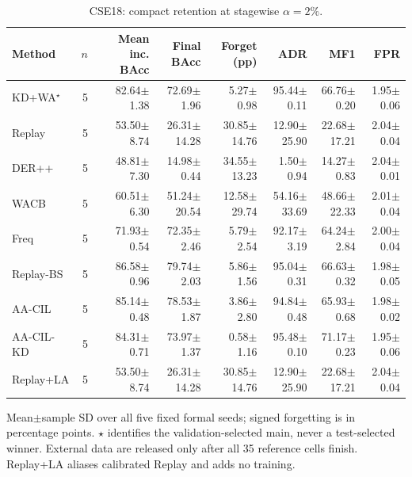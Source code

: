 \begin{table}[t]
\centering\scriptsize
\setlength{\tabcolsep}{3.3pt}
\caption{CSE18: compact retention at stagewise $\alpha=2\%$.}\label{tab:compact-results-cse_cic_ids2018}
\begin{tabular}{lrrrrrrr}
\toprule
Method & $n$ & Mean inc. BAcc & Final BAcc & Forget (pp) & ADR & MF1 & FPR \\
\midrule
KD+WA$^\star$ & 5 & 82.64$\pm$1.38 & 72.69$\pm$1.96 & 5.27$\pm$0.98 & 95.44$\pm$0.11 & 66.76$\pm$0.20 & 1.95$\pm$0.06 \\
Replay & 5 & 53.50$\pm$8.74 & 26.31$\pm$14.28 & 30.85$\pm$14.76 & 12.90$\pm$25.90 & 22.68$\pm$17.21 & 2.04$\pm$0.04 \\
DER++ & 5 & 48.81$\pm$7.30 & 14.98$\pm$0.44 & 34.55$\pm$13.23 & 1.50$\pm$0.94 & 14.27$\pm$0.83 & 2.04$\pm$0.01 \\
WACB & 5 & 60.51$\pm$6.30 & 51.24$\pm$20.54 & 12.58$\pm$29.74 & 54.16$\pm$33.69 & 48.66$\pm$22.33 & 2.01$\pm$0.04 \\
Freq & 5 & 71.93$\pm$0.54 & 72.35$\pm$2.46 & 5.79$\pm$2.54 & 92.17$\pm$3.19 & 64.24$\pm$2.84 & 2.00$\pm$0.04 \\
Replay-BS & 5 & 86.58$\pm$0.96 & 79.74$\pm$2.03 & 5.86$\pm$1.56 & 95.04$\pm$0.31 & 66.63$\pm$0.32 & 1.98$\pm$0.05 \\
AA-CIL & 5 & 85.14$\pm$0.48 & 78.53$\pm$1.87 & 3.86$\pm$2.80 & 94.84$\pm$0.48 & 65.93$\pm$0.68 & 1.98$\pm$0.02 \\
AA-CIL-KD & 5 & 84.31$\pm$0.71 & 73.97$\pm$1.37 & 0.58$\pm$1.16 & 95.48$\pm$0.10 & 71.17$\pm$0.23 & 1.95$\pm$0.06 \\
Replay+LA & 5 & 53.50$\pm$8.74 & 26.31$\pm$14.28 & 30.85$\pm$14.76 & 12.90$\pm$25.90 & 22.68$\pm$17.21 & 2.04$\pm$0.04 \\
\bottomrule
\end{tabular}
\par\smallskip\begin{minipage}{0.98\textwidth}\scriptsize Mean$\pm$sample SD over all five fixed formal seeds; signed forgetting is in percentage points. $\star$ identifies the validation-selected main, never a test-selected winner. External data are released only after all 35 reference cells finish. Replay+LA aliases calibrated Replay and adds no training.\end{minipage}
\end{table}

